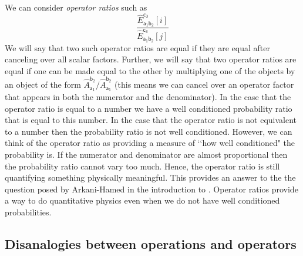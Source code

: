 \documentclass[10pt]{article}
\begin{document}
We can consider \emph{operator ratios} such as
\begin{equation}\label{operatorratio}
\frac{\hat E_\mathsf{a_1b_2}^\mathsf{c_3}[i]}{\hat E_\mathsf{a_1b_2}^\mathsf{c_3}[j]}
\end{equation}
We will say that two such operator ratios are equal if they are equal after canceling over all scalar factors.  Further, we will say that two operator ratios are equal if one can be made equal to the other by multiplying one of the objects by an object of the form $\hat A_\mathsf{a_1}^\mathsf{b_2} / \hat A_\mathsf{a_1}^\mathsf{b_2}$ (this means we can cancel over an operator factor that appears in both the numerator and the denominator).
In the case that the operator ratio is equal to a number we have a well conditioned probability ratio that is equal to this number.    In the case that the operator ratio is not equivalent to a number then the probability ratio is not well conditioned.  However, we can think of the operator ratio as providing a measure of \lq\lq how well conditioned" the probability is.   If the numerator and denominator are almost proportional then the probability ratio cannot vary too much.   Hence, the operator ratio is still quantifying something physically meaningful.  This provides an answer to the the question posed by Arkani-Hamed in the introduction to \cite{arkanihamed2011quantum}. Operator ratios provide a way to do quantitative physics even when we do not have well conditioned probabilities.



\subsection{Disanalogies  between operations and operators}
\end{document}
